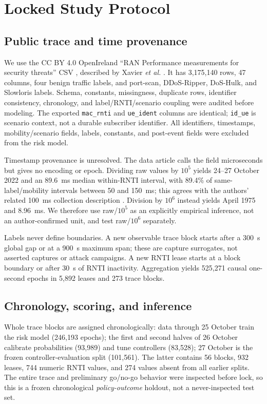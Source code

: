 \documentclass[journal,10pt]{IEEEtran}
\begin{document}
\section{Locked Study Protocol}
\subsection{Public trace and time provenance}
We use the CC BY 4.0 OpenIreland ``RAN Performance measurements for security threats'' CSV \cite{xavier2024data}, described by Xavier \emph{et al.} \cite{xavier2024dataset}. It has 3,175,140 rows, 47 columns, four benign traffic labels, and port-scan, DDoS-Ripper, DoS-Hulk, and Slowloris labels. Schema, constants, missingness, duplicate rows, identifier consistency, chronology, and label/RNTI/scenario coupling were audited before modeling. The exported \texttt{mac\_rnti} and \texttt{ue\_ident} columns are identical; \texttt{id\_ue} is scenario context, not a durable subscriber identifier. All identifiers, timestamps, mobility/scenario fields, labels, constants, and post-event fields were excluded from the risk model.

Timestamp provenance is unresolved. The data article calls the field microseconds but gives no encoding or epoch. Dividing raw values by $10^5$ yields 24--27 October 2022 and an 89.6~ms median within-RNTI interval, with 89.4\% of same-label/mobility intervals between 50 and 150~ms; this agrees with the authors' related 100~ms collection description \cite{xavier2023early}. Division by $10^6$ instead yields April 1975 and 8.96~ms. We therefore use raw/$10^5$ as an explicitly empirical inference, not an author-confirmed unit, and test raw/$10^6$ separately.

Labels never define boundaries. A new observable trace block starts after a 300~s global gap or at a 900~s maximum span; these are capture surrogates, not asserted captures or attack campaigns. A new RNTI lease starts at a block boundary or after 30~s of RNTI inactivity. Aggregation yields 525,271 causal one-second epochs in 5,892 leases and 273 trace blocks.

\subsection{Chronology, scoring, and inference}
Whole trace blocks are assigned chronologically: data through 25 October train the risk model (246,193 epochs); the first and second halves of 26 October calibrate probabilities (93,989) and tune controllers (83,528); 27 October is the frozen controller-evaluation split (101,561). The latter contains 56 blocks, 932 leases, 744 numeric RNTI values, and 274 values absent from all earlier splits. The entire trace and preliminary go/no-go behavior were inspected before lock, so this is a frozen chronological \emph{policy-outcome} holdout, not a never-inspected test set.
\end{document}
